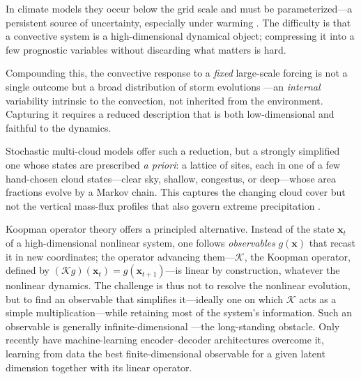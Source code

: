 \documentclass[
    aps,
    prl,
    reprint,
    superscriptaddress,
    amsmath,amssymb,
    floatfix,
    nofootinbib
]{revtex4-2}
\begin{document}
In climate models they occur below the grid scale and must be parameterized---a persistent source of uncertainty, especially under warming \cite{yang2023impact, bolot2025no}. The difficulty is that a convective system is a high-dimensional dynamical object; compressing it into a few prognostic variables without discarding what matters is hard.

Compounding this, the convective response to a \emph{fixed} large-scale forcing is not a single outcome but a broad distribution of storm evolutions \cite{abramian2025key, feng2025mesoscale, hu2020observed, fiolleau2024database}---an \emph{internal} variability intrinsic to the convection, not inherited from the environment. Capturing it requires a reduced description that is both low-dimensional and faithful to the dynamics.

Stochastic multi-cloud models \cite{khouider2006multicloud, majda2008stochastic, khouider2010stochastic} offer such a reduction, but a strongly simplified one whose states are prescribed \emph{a priori}: a lattice of sites, each in one of a few hand-chosen cloud states---clear sky, shallow, congestus, or deep---whose area fractions evolve by a Markov chain. This captures the changing cloud cover but not the vertical mass-flux profiles that also govern extreme precipitation \cite{MullerYukari19, singh2012upward, abramian2023extreme, wang2022convective, li2025bimodal}.

Koopman operator theory \cite{koopman1931hamiltonian, brunton2021modern} offers a principled alternative. Instead of the state $\mathbf{x}_t$ of a high-dimensional nonlinear system, one follows \emph{observables} $g(\mathbf{x})$ that recast it in new coordinates; the operator advancing them---$\mathcal{K}$, the Koopman operator, defined by $(\mathcal{K}g)(\mathbf{x}_t) = g(\mathbf{x}_{t+1})$---is linear by construction, whatever the nonlinear dynamics. The challenge is thus not to resolve the nonlinear evolution, but to find an observable that simplifies it---ideally one on which $\mathcal{K}$ acts as a simple multiplication---while retaining most of the system's information. Such an observable is generally infinite-dimensional \cite{brunton2021modern}---the long-standing obstacle. Only recently have machine-learning encoder--decoder architectures \cite{lusch2018deep, nathaniel2026generative} overcome it, learning from data the best finite-dimensional observable for a given latent dimension together with its linear operator.
\end{document}
